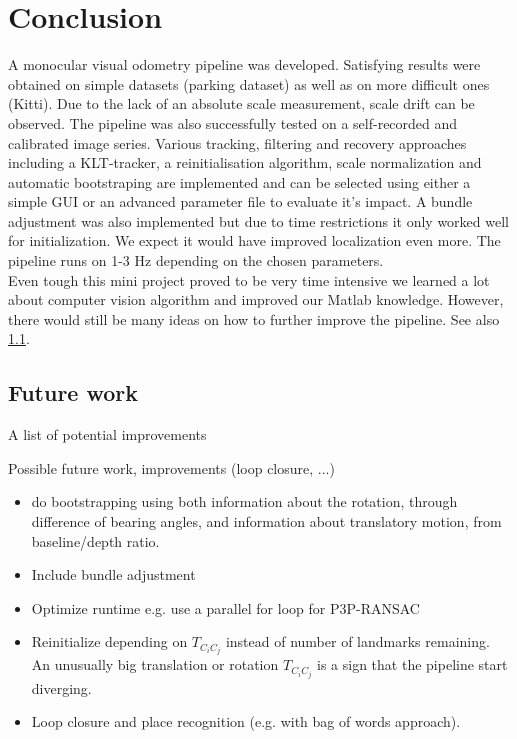 \section{Conclusion}

A monocular visual odometry pipeline was developed. Satisfying results were obtained on simple datasets (parking dataset) as well as on more difficult ones (Kitti). Due to the lack of an absolute scale measurement, scale drift can be observed. The pipeline was also successfully tested on a self-recorded and calibrated image series. Various tracking, filtering and recovery approaches including a KLT-tracker, a reinitialisation algorithm, scale normalization and automatic bootstraping are implemented and can be selected using either a simple GUI or an advanced parameter file to evaluate it's impact. A bundle adjustment was also implemented but due to time restrictions it only worked well for initialization. We expect it would have improved localization even more. The pipeline runs on 1-3 Hz depending on the chosen parameters.\\

Even tough this mini project proved to be very time intensive we learned a lot about computer vision algorithm and improved our Matlab knowledge. However, there would still be many ideas on how to further improve the pipeline. See also \cref{future}.

\subsection{Future work}\label{future}
A list of potential improvements

Possible future work, improvements (loop closure, ...)

\begin{itemize}
\item do bootstrapping using both information about the rotation, through difference of bearing angles, and information about translatory motion, from baseline/depth ratio.
\item Include bundle adjustment
\item Optimize runtime e.g. use a parallel for loop for P3P-RANSAC
\item Reinitialize depending on $T_{C_iC_j}$ instead of number of landmarks remaining. An unusually big translation or rotation $T_{C_iC_j}$ is a sign that the pipeline start diverging.
\item Loop closure and place recognition (e.g. with bag of words approach).
\end{itemize}
